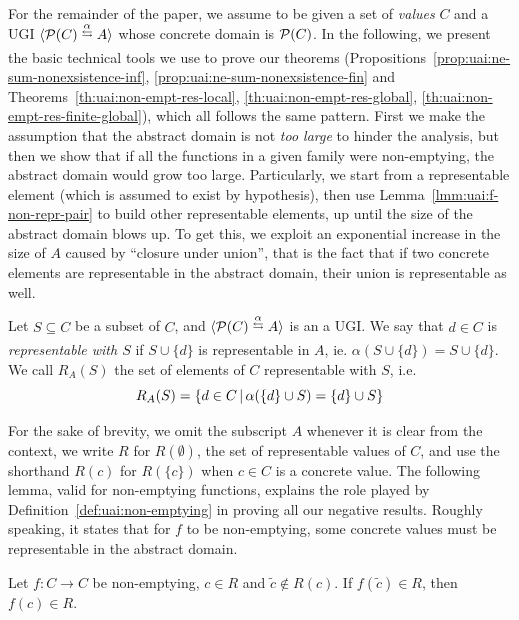 For the remainder of the paper, we assume to be given a set of \emph{values} $C$ and a UGI $\ugi{\pow(C)}{\alpha}{A}$ whose concrete domain is $\mathcal{P}(C)$.
In the following, we present the basic technical tools we use to prove our theorems (Propositions~\ref{prop:uai:ne-sum-nonexsistence-inf}, \ref{prop:uai:ne-sum-nonexsistence-fin} and Theorems~\ref{th:uai:non-empt-res-local}, \ref{th:uai:non-empt-res-global}, \ref{th:uai:non-empt-res-finite-global}), which all follows the same pattern. First we make the assumption that the abstract domain is not \emph{too large} to hinder the analysis, but then we show that if all the functions in a given family were non-emptying, the abstract domain would grow too large.
Particularly, we start from a representable element (which is assumed to exist by hypothesis), then use Lemma~\ref{lmm:uai:f-non-repr-pair} to build other representable elements, up until the size of the abstract domain blows up. To get this, we exploit an exponential increase in the size of $A$ caused by ``closure under union'', that is the fact that if two concrete elements are representable in the abstract domain, their union is representable as well.

\begin{definition}\label{def:uai:repr-with-set}
	Let $S \subseteq C$ be a subset of $C$, and $\ugi{\pow(C)}{\alpha}{A}$ is an a UGI. We say that $d \in C$ is \emph{representable with $S$} if $S \cup \{ d \}$ is representable in $A$, ie. $\alpha(S \cup \{ d \}) = S \cup \{ d \}$. We call $R_A(S)$ the set of elements of $C$ representable with $S$, i.e.
	\[
	R_A(S) = \{ d \in C \,\vert\, \alpha(\{ d \} \cup S) = \{ d \} \cup S \}
	\]
\end{definition}

For the sake of brevity, we omit the subscript $A$ whenever it is clear from the context, we write $R$ for $R(\emptyset)$, the set of representable values of $C$, and use the shorthand $R(c)$ for $R(\{ c \})$ when $c \in C$ is a concrete value.
The following lemma, valid for non-emptying functions, explains the role played by Definition~\ref{def:uai:non-emptying} in proving all our negative results. Roughly speaking, it states that for $f$ to be non-emptying, some concrete values must be representable in the abstract domain.

\begin{lemma}\label{lmm:uai:f-non-repr-pair}
	Let $f: C \rightarrow C$ be non-emptying, $c \in R$ and $\tilde{c} \notin R(c)$. If $f(\tilde{c})\in R$, then $f(c) \in R$.
\end{lemma}

